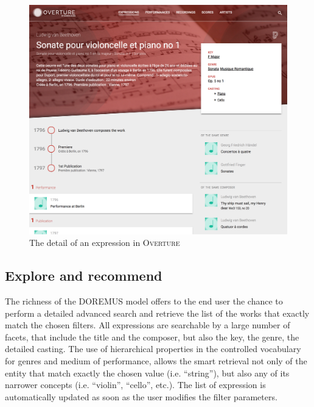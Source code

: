 \documentclass{article}
\begin{document}
\begin{figure}
 \centerline{
 \includegraphics[width=\columnwidth]{figs/overture-sonate-cello.png}}
 \caption{The detail of an expression in \textsc{Overture}}
 \label{fig:overture-detail}
\end{figure}

\subsection{Explore and recommend}

The richness of the DOREMUS model offers to the end user the chance to perform a detailed advanced search and retrieve the list of the works that exactly match the chosen filters. All expressions are searchable by a large number of facets, that include the title and the composer, but also the key, the genre, the detailed casting. The use of hierarchical properties in the controlled vocabulary for genres and medium of performance, allows the smart retrieval not only of the entity that match exactly the chosen value (i.e. ``string''), but also any of its narrower concepts (i.e. ``violin'', ``cello'', etc.). The list of expression is automatically updated as soon as the user modifies the filter parameters.
\end{document}

